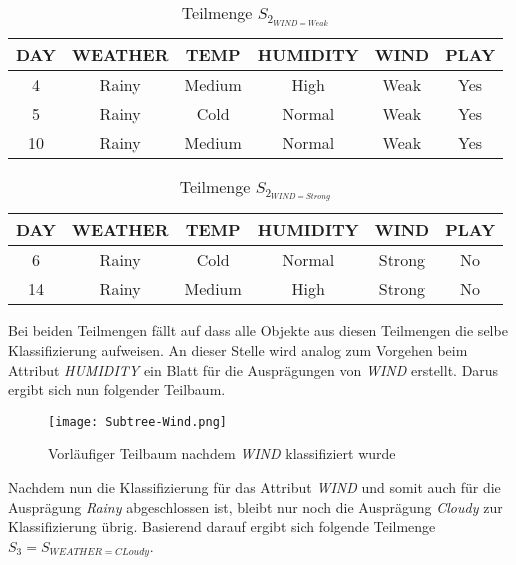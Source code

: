 \begin{table}[H]
    \centering
    \begin{tabular}{cccccc}
        \toprule
        \textbf{DAY} & \textbf{WEATHER} & \textbf{TEMP} & \textbf{HUMIDITY} & \textbf{WIND} & \textbf{PLAY} \\
        \toprule
        4   &Rainy	&Medium	&High	&Weak	&Yes \\
        5   &Rainy	&Cold	&Normal	&Weak	&Yes \\
        10  &Rainy	&Medium	&Normal	&Weak	&Yes \\
        \bottomrule
    \end{tabular}
    \caption{Teilmenge $S_{2_{WIND=Weak}}$}
    \label{table:datensatz-wind-weak}
\end{table}

\begin{table}[H]
    \centering
    \begin{tabular}{cccccc}
        \toprule
        \textbf{DAY} & \textbf{WEATHER} & \textbf{TEMP} & \textbf{HUMIDITY} & \textbf{WIND} & \textbf{PLAY} \\
        \toprule
        6   &Rainy	&Cold	&Normal	&Strong	&No  \\
        14  &Rainy	&Medium	&High	&Strong	&No  \\
        \bottomrule
    \end{tabular}
    \caption{Teilmenge $S_{2_{WIND=Strong}}$}
    \label{table:datensatz-wind-strong}
\end{table}

Bei beiden Teilmengen fällt auf dass alle Objekte aus diesen Teilmengen die selbe Klassifizierung aufweisen. An dieser Stelle wird analog zum Vorgehen beim Attribut \textit{HUMIDITY} ein Blatt für die Ausprägungen von \textit{WIND} erstellt. Darus ergibt sich nun folgender Teilbaum.

\begin{figure}[htbp]
    \centering
    \texttt{[image: Subtree-Wind.png]}
    \caption{Vorläufiger Teilbaum nachdem \textit{WIND} klassifiziert wurde}
\end{figure}

Nachdem nun die Klassifizierung für das Attribut \textit{WIND} und somit auch für die Ausprägung \textit{Rainy} abgeschlossen ist, bleibt nur noch die Ausprägung \textit{Cloudy} zur Klassifizierung übrig. Basierend darauf ergibt sich folgende Teilmenge $S_{3} = S_{WEATHER=CLoudy}$.

